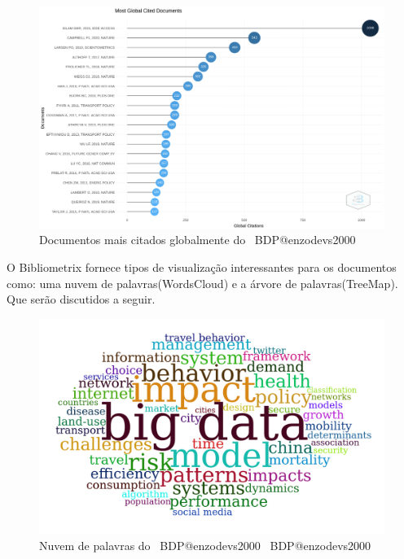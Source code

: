 \begin{figure}[H]
    \centering
    \includegraphics[width=1\textwidth]{experiments/enzodevs2000/AnaliseBibliometrica/BigDataInPolicy/Figures/Graficos/NovoDataset/Documents/MostCitedDocuments.png}
    \caption{Documentos mais citados globalmente do
    \dataset\ BDP@enzodevs2000}
    \label{fig:enzodevs2000:BDP:newdataset:documents:most_cited_global}
\end{figure}

O Bibliometrix fornece tipos de visualização interessantes para os documentos como: uma nuvem de palavras(WordsCloud) e a árvore de palavras(TreeMap). Que serão discutidos a seguir.

\begin{figure}[H]
    \centering
    \includegraphics[width=1\textwidth]{experiments/enzodevs2000/AnaliseBibliometrica/BigDataInPolicy/Figures/Graficos/NovoDataset/Documents/wordsCloud.png}
    \caption{Nuvem de palavras do \dataset\ BDP@enzodevs2000
    \dataset\ BDP@enzodevs2000}
    \label{fig:enzodevs2000:BDP:newdataset:documents:words_cloud}
\end{figure}

